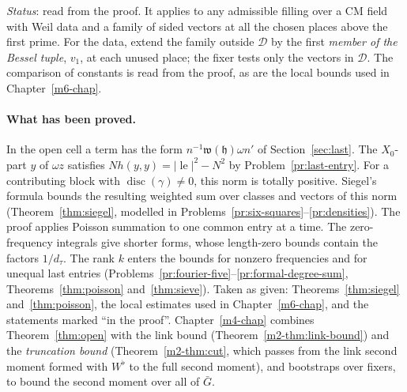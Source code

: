 \documentclass[reqno]{amsart}
\newcounter{chap}
\theoremstyle{definition}
\theoremstyle{plain}
\theoremstyle{remark}
\newcommand{\Dc}{\mathcal{D}}
\newcommand{\lE}{\operatorname{le}}
\newcommand{\disc}{\operatorname{disc}}
\begin{document}
\noindent\emph{Status}: read from the proof.  It applies to any admissible filling over a CM field with Weil data and a family of sided vectors at all the chosen places above the first prime.  For the data, extend the family outside \(\Dc\) by the first \emph{member of the Bessel tuple}, \(v_1\), at each unused place; the fixer tests only the vectors in \(\Dc\).  The comparison of constants is read from the proof, as are the local bounds used in Chapter~\ref{m6-chap}.

\paragraph{What has been proved.}  In the open cell a term has the form \(n^{-1}\mathfrak w(\mathfrak h)\omega n'\) of Section~\ref{sec:last}.  The \(X_0\)-part \(y\) of \(\omega z\) satisfies \(N h(y,y)=\lvert\lE\rvert^2-N^2\) by Problem~\ref{pr:last-entry}.  For a contributing block with \(\disc(\gamma)\ne0\), this norm is totally positive.  Siegel's formula bounds the resulting weighted sum over classes and vectors of this norm (Theorem~\ref{thm:siegel}, modelled in Problems~\ref{pr:six-squares}--\ref{pr:densities}).  The proof applies Poisson summation to one common entry at a time.  The zero-frequency integrals give shorter forms, whose length-zero bounds contain the factors \(1/d_\tau\).  The rank \(k\) enters the bounds for nonzero frequencies and for unequal last entries (Problems~\ref{pr:fourier-five}--\ref{pr:formal-degree-sum}, Theorems~\ref{thm:poisson} and~\ref{thm:sieve}).  Taken as given: Theorems~\ref{thm:siegel} and~\ref{thm:poisson}, the local estimates used in Chapter~\ref{m6-chap}, and the statements marked ``in the proof''.  Chapter~\ref{m4-chap} combines Theorem~\ref{thm:open} with the link bound (Theorem~\ref{m2-thm:link-bound}) and the \emph{truncation bound} (Theorem~\ref{m2-thm:cut}, which passes from the link second moment formed with \(W^\flat\) to the full second moment), and bootstraps over fixers, to bound the second moment over all of \(\bar G\).
\end{document}
